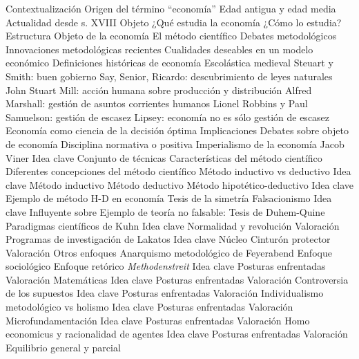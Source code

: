 \documentclass{nuevotema}
\begin{document}
\begin{esquema}[enumerate]
	\1[] 
		\2 Contextualización
			\3 Origen del término ``economía''
			\3 Edad antigua y edad media
			\3 Actualidad desde s. XVIII
		\2 Objeto
			\3 ¿Qué estudia la economía
			\3 ¿Cómo lo estudia?
		\2 Estructura
			\3 Objeto de la economía
			\3 El método científico
			\3 Debates metodológicos
			\3 Innovaciones metodológicas recientes
			\3 Cualidades deseables en un modelo económico
	\1 
		\2 Definiciones históricas de economía
			\3 Escolástica medieval
			\3 Steuart y Smith: buen gobierno
			\3 Say, Senior, Ricardo: descubrimiento de leyes naturales
			\3 John Stuart Mill: acción humana sobre producción y distribución
			\3 Alfred Marshall: gestión de asuntos corrientes humanos
			\3 Lionel Robbins y Paul Samuelson: gestión de escasez
			\3 Lipsey: economía no es sólo gestión de escasez
			\3 Economía como ciencia de la decisión óptima
			\3 Implicaciones
		\2 Debates sobre objeto de economía
			\3 Disciplina normativa o positiva
			\3 Imperialismo de la economía
			\3 Jacob Viner
	\1 
		\2 Idea clave
			\3 Conjunto de técnicas
			\3 Características del método científico
			\3 Diferentes concepciones del método científico
		\2 Método inductivo vs deductivo
			\3 Idea clave
			\3 Método inductivo
			\3 Método deductivo
		\2 Método hipotético-deductivo
			\3 Idea clave
			\3 Ejemplo de método H-D en economía
			\3 Tesis de la simetría
		\2 Falsacionismo
			\3 Idea clave
			\3 Influyente sobre
			\3 Ejemplo de teoría no falsable:
			\3 Tesis de Duhem-Quine
		\2 Paradigmas científicos de Kuhn
			\3 Idea clave
			\3 Normalidad y revolución
			\3 Valoración
		\2 Programas de investigación de Lakatos
			\3 Idea clave
			\3 Núcleo
			\3 Cinturón protector
			\3 Valoración
		\2 Otros enfoques
			\3 Anarquismo metodológico de Feyerabend
			\3 Enfoque sociológico
			\3 Enfoque retórico
	\1 
		\2 \textit{Methodenstreit}
			\3 Idea clave
			\3 Posturas enfrentadas
			\3 Valoración
		\2 Matemáticas
			\3 Idea clave
			\3 Posturas enfrentadas
			\3 Valoración
		\2 Controversia de los supuestos
			\3 Idea clave
			\3 Posturas enfrentadas
			\3 Valoración
		\2 Individualismo metodológico vs holismo
			\3 Idea clave
			\3 Posturas enfrentadas
			\3 Valoración
		\2 Microfundamentación
			\3 Idea clave
			\3 Posturas enfrentadas
			\3 Valoración
		\2 Homo economicus y racionalidad de agentes
			\3 Idea clave
			\3 Posturas enfrentadas
			\3 Valoración
		\2 Equilibrio general y parcial

\end{esquema}
\end{document}
